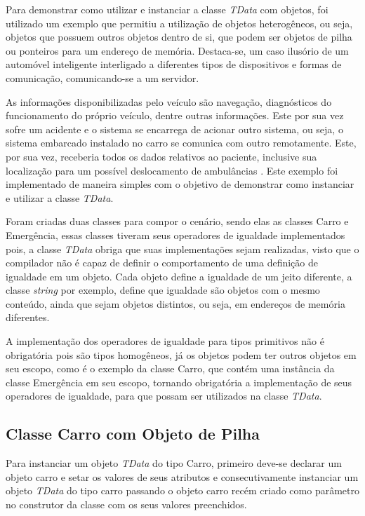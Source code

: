 Para demonstrar como utilizar e instanciar a classe \textit{TData} com objetos, foi utilizado um exemplo que permitiu a utilização de objetos heterogêneos, ou seja, objetos que possuem outros objetos dentro de si, que podem ser objetos de pilha ou ponteiros para um endereço de memória. Destaca-se, um caso ilusório de um automóvel inteligente interligado a diferentes tipos de dispositivos e formas de comunicação, comunicando-se a um servidor. 

As informações disponibilizadas pelo veículo são navegação, diagnósticos do funcionamento do próprio veículo, dentre outras informações. Este por sua vez sofre um acidente e o sistema se encarrega de acionar outro sistema, ou seja, o sistema embarcado instalado no carro se comunica com outro remotamente. Este, por sua vez, receberia todos os dados relativos ao paciente, inclusive sua localização para um possível deslocamento de ambulâncias \cite{Valderi:2008}. Este exemplo foi implementado de maneira simples com o objetivo de demonstrar como instanciar e utilizar a classe \textit{TData}. 

Foram criadas duas classes para compor o cenário, sendo elas as classes Carro e Emergência, essas classes tiveram seus operadores de igualdade implementados pois, a classe \textit{TData} obriga que suas implementações sejam realizadas, visto que o compilador não é capaz de definir o comportamento de uma definição de igualdade em um objeto. Cada objeto define a igualdade de um jeito diferente, a classe \textit{string} por exemplo, define que igualdade são objetos com o mesmo conteúdo, ainda que sejam objetos distintos, ou seja, em endereços de memória diferentes.

A implementação dos operadores de igualdade para tipos primitivos não é obrigatória pois são tipos homogêneos, já os objetos podem ter outros objetos em seu escopo, como é o exemplo da classe Carro, que contém uma instância da classe Emergência em seu escopo, tornando obrigatória a implementação de seus operadores de igualdade, para que possam ser utilizados na classe \textit{TData}.

\subsection{Classe Carro com Objeto de Pilha} \label{subsec:classeObjetoPilha}

Para instanciar um objeto \textit{TData} do tipo Carro, primeiro deve-se declarar um objeto carro e setar os valores de seus atributos e consecutivamente instanciar um objeto \textit{TData} do tipo carro passando o objeto carro recém criado como parâmetro no construtor da classe com os seus valores preenchidos. 

